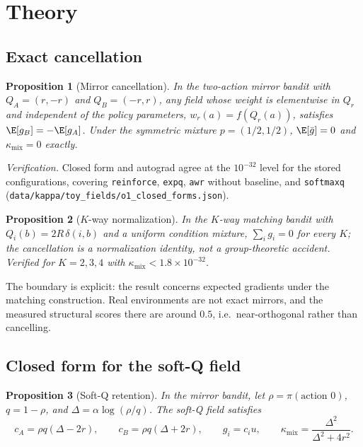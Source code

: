\documentclass{article}
\newtheorem{proposition}{Proposition}
\newcommand{\kmix}{\kappa_{\mathrm{mix}}}
\newcommand{\gbar}{\bar{g}}
\begin{document}
\section{Theory}
\label{sec:theory}

\subsection{Exact cancellation}
\label{sec:theory-cancel}

\begin{proposition}[Mirror cancellation]
\label{prop:mirror}
In the two-action mirror bandit with $Q_A=(r,-r)$ and $Q_B=(-r,r)$, any field
whose weight is elementwise in $Q_r$ and independent of the policy parameters,
$w_r(a)=f(Q_r(a))$, satisfies
$\E[g_B]=-\E[g_A]$. Under the symmetric mixture $p=(1/2,1/2)$,
$\E[\gbar]=0$ and $\kmix=0$ exactly.
\end{proposition}

\noindent\emph{Verification.} Closed form and autograd agree at the
$10^{-32}$ level for the stored configurations, covering \texttt{reinforce},
\texttt{expq}, \texttt{awr} without baseline, and \texttt{softmaxq}
(\texttt{data/kappa/toy\_fields/o1\_closed\_forms.json}).

\begin{proposition}[$K$-way normalization]
\label{prop:kway}
In the $K$-way matching bandit with $Q_i(b)=2R\,\delta(i,b)$ and a uniform
condition mixture, $\sum_i g_i=0$ for every $K$; the cancellation is a
normalization identity, not a group-theoretic accident. Verified for
$K=2,3,4$ with $\kmix<1.8\times10^{-32}$.
\end{proposition}

The boundary is explicit: the result concerns expected gradients under the
matching construction. Real environments are not exact mirrors, and the
measured structural scores there are around $0.5$, i.e.\ near-orthogonal rather
than cancelling.

\subsection{Closed form for the soft-Q field}
\label{sec:theory-softq}

\begin{proposition}[Soft-Q retention]
\label{prop:softq}
In the mirror bandit, let $\rho=\pi(\text{action }0)$, $q=1-\rho$, and
$\Delta=\alpha\log(\rho/q)$. The soft-Q field satisfies
\begin{equation}
c_A=\rho q(\Delta-2r), \qquad c_B=\rho q(\Delta+2r), \qquad g_i=c_i u,
\qquad
\kmix=\frac{\Delta^2}{\Delta^2+4r^2}.
\end{equation}
\end{proposition}
\end{document}
